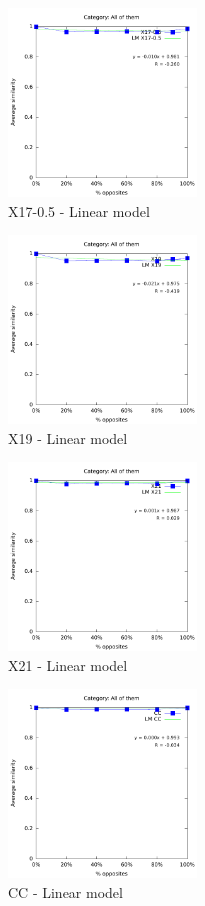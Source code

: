 \documentclass[a4paper,10pt]{article}
\begin{document}
\begin{figure}[ht]{\centering
\includegraphics[height=5cm]{allcat_X17-0_5_LM.pdf}
\caption{X17-0.5 - Linear model}
}\end{figure}
\begin{figure}[ht]{\centering
\includegraphics[height=5cm]{allcat_X19_LM.pdf}
\caption{X19 - Linear model}
}\end{figure}
\begin{figure}[ht]{\centering
\includegraphics[height=5cm]{allcat_X21_LM.pdf}
\caption{X21 - Linear model}
}\end{figure}
\begin{figure}[ht]{\centering
\includegraphics[height=5cm]{allcat_CC_LM.pdf}
\caption{CC - Linear model}
}\end{figure}
\end{document}
